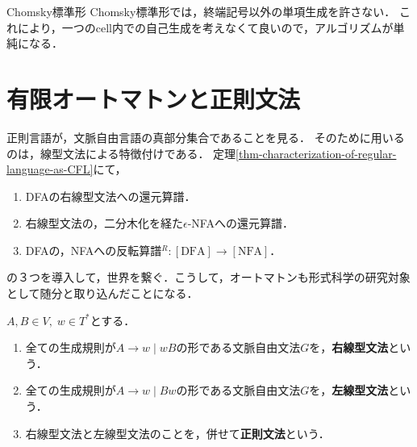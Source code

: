 \begin{itembox}[l]{Chomsky標準形}
    Chomsky標準形では，終端記号以外の単項生成を許さない．
    これにより，一つのcell内での自己生成を考えなくて良いので，アルゴリズムが単純になる．
\end{itembox}

\section{有限オートマトンと正則文法}

\begin{tcolorbox}[colframe=ForestGreen, colback=ForestGreen!10!white, breakable]
    正則言語が，文脈自由言語の真部分集合であることを見る．
    そのために用いるのは，線型文法による特徴付けである．
    定理\ref{thm-characterization-of-regular-language-as-CFL}にて，
    \begin{enumerate}
        \item DFAの右線型文法への還元算譜．
        \item 右線型文法の，二分木化を経た$\epsilon$-NFAへの還元算譜．
        \item DFAの，NFAへの反転算譜${}^R:[\mathrm{DFA}]\to[\mathrm{NFA}]$．
    \end{enumerate}
    の３つを導入して，世界を繋ぐ．こうして，オートマトンも形式科学の研究対象として随分と取り込んだことになる．
\end{tcolorbox}

\begin{definition}\label{def-regular-grammar}
    $A,B\in V,\;w\in T^*$とする．
    \begin{enumerate}
        \item 全ての生成規則が$A\to w\mid wB$の形である文脈自由文法$G$を，\textbf{右線型文法}という．
        \item 全ての生成規則が$A\to w\mid Bw$の形である文脈自由文法$G$を，\textbf{左線型文法}という．
        \item 右線型文法と左線型文法のことを，併せて\textbf{正則文法}という．
    \end{enumerate}
\end{definition}

